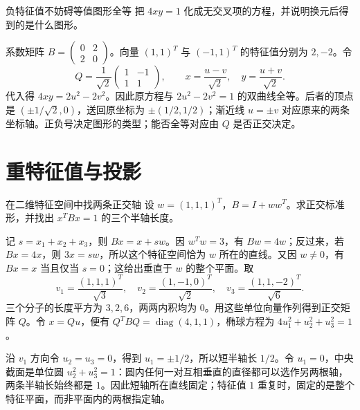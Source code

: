 \begin{example}{负特征值不妨碍等值图形全等}
把 $4xy=1$ 化成无交叉项的方程，并说明换元后得到的是什么图形。
\end{example}
\begin{solution}
系数矩阵 $B=\begin{pmatrix}0&2\\2&0\end{pmatrix}$。向量 $(1,1)^T$ 与 $(-1,1)^T$ 的特征值分别为 $2,-2$。令
\[
Q=\frac1{\sqrt2}\begin{pmatrix}1&-1\\1&1\end{pmatrix},
\qquad
x=\frac{u-v}{\sqrt2},\quad y=\frac{u+v}{\sqrt2}.
\]
代入得 $4xy=2u^2-2v^2$。因此原方程与 $2u^2-2v^2=1$ 的双曲线全等。后者的顶点是 $(\pm1/\sqrt2,0)$，送回原坐标为 $\pm(1/2,1/2)$；渐近线 $u=\pm v$ 对应原来的两条坐标轴。正负号决定图形的类型；能否全等对应由 $Q$ 是否正交决定。
\end{solution}

\section{重特征值与投影}

\begin{example}{在二维特征空间中找两条正交轴}
设 $w=(1,1,1)^T$，$B=I+ww^T$。求正交标准形，并找出 $x^TBx=1$ 的三个半轴长度。
\end{example}
\begin{solution}
记 $s=x_1+x_2+x_3$，则 $Bx=x+sw$。因 $w^Tw=3$，有 $Bw=4w$；反过来，若 $Bx=4x$，则 $3x=sw$，所以这个特征空间恰为 $w$ 所在的直线。又因 $w\ne0$，有 $Bx=x$ 当且仅当 $s=0$；这给出垂直于 $w$ 的整个平面。取
\[
v_1=\frac{(1,1,1)^T}{\sqrt3},\quad
v_2=\frac{(1,-1,0)^T}{\sqrt2},\quad
v_3=\frac{(1,1,-2)^T}{\sqrt6}.
\]
三个分子的长度平方为 $3,2,6$，两两内积均为 $0$。用这些单位向量作列得到正交矩阵 $Q$。令 $x=Qu$，便有 $Q^TBQ=\operatorname{diag}(4,1,1)$，椭球方程为 $4u_1^2+u_2^2+u_3^2=1$。

沿 $v_1$ 方向令 $u_2=u_3=0$，得到 $u_1=\pm1/2$，所以短半轴长 $1/2$。令 $u_1=0$，中央截面是单位圆 $u_2^2+u_3^2=1$：圆内任何一对互相垂直的直径都可以选作另两根轴，两条半轴长始终都是 $1$。因此短轴所在直线固定；特征值 $1$ 重复时，固定的是整个特征平面，而非平面内的两根指定轴。
\end{solution}

